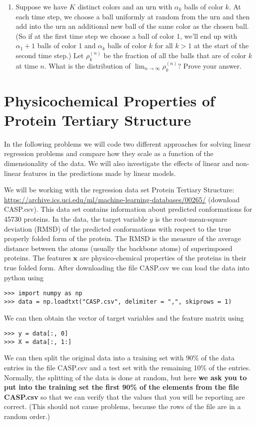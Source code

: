 \documentclass[submit]{harvardml}
\begin{document}
\begin{problem}
\begin{enumerate}[label=(\alph*)]
\item Suppose we have $K$ distinct colors and an urn with $\alpha_k$ balls of color $k$. At each time step, we choose a ball uniformly at random from the urn and then add into the urn an additional new ball of the same color as the chosen ball. (So if at the first time step we choose a ball of color 1, we'll end up with $\alpha_1+1$ balls of color 1 and $\alpha_k$ balls of color $k$ for all $k > 1$ at the start of the second time step.) Let $\rho_{k}^{(n)}$ be the fraction of all the balls that are of color $k$ at time $n$. What is the distribution of $\lim_{n \rightarrow \infty} \rho_k^{(n)}$? Prove your answer.
\end{enumerate}
\vspace{0.1cm}
\end{problem}


\newpage
\section*{Physicochemical Properties of Protein Tertiary Structure}

In the following problems we will code two different approaches for
solving linear regression problems and compare how they scale as a function of
the dimensionality of the data.  We will also investigate the effects of
linear and non-linear features in the predictions made by linear models.

We will be working with the regression data set Protein
Tertiary Structure:
\url{https://archive.ics.uci.edu/ml/machine-learning-databases/00265/}
(download CASP.csv). This data set contains information about predicted 
conformations for 45730
proteins. In the data, the target variable $y$ is the root-mean-square
deviation (RMSD) of the predicted conformations with respect to the true properly
folded form of the protein. The RMSD is the measure of the average distance
between the atoms (usually the backbone atoms) of superimposed proteins.
The features $\mathbf{x}$ are
physico-chemical properties of the proteins in their true folded form. After
downloading the file CASP.csv we can load the data into python using
\begin{verbatim}
>>> import numpy as np
>>> data = np.loadtxt("CASP.csv", delimiter = ",", skiprows = 1)
\end{verbatim}
We can then obtain the vector of target variables and the feature matrix using
\begin{verbatim}
>>> y = data[:, 0]
>>> X = data[:, 1:]
\end{verbatim}
We can then split the original data into a training set with 90\% of the data
entries in the file CASP.csv and a test set with the remaining 10\% of the
entries. Normally, the splitting of the data is done at random, but here {\bf we ask
you to put into the training set the first 90\% of the elements from the
file CASP.csv} so that we can verify that the values that you will be reporting are correct.
(This should not cause problems, because the rows of the file are in a random order.)
\end{document}
